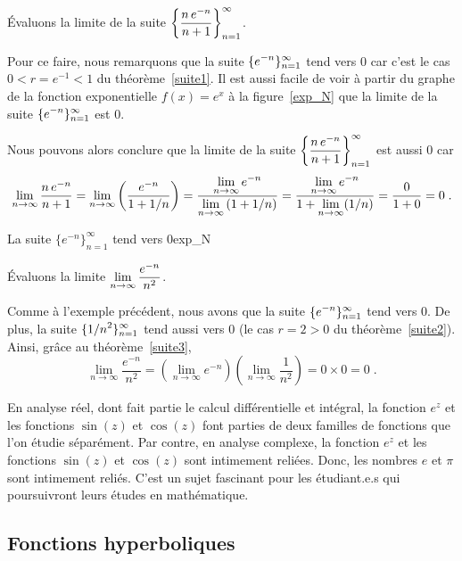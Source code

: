 {\begin{egg}
Évaluons la limite de la suite
$\displaystyle \left\{\frac{n\,e^{-n}}{n+1}\right\}_{n=1}^\infty$.

Pour ce faire, nous remarquons que la suite
$\displaystyle \{ e^{-n} \}_{n=1}^\infty$ tend vers $0$ car c'est le
cas $0< r = e^{-1}<1$ du théorème~\ref{suite1}.  Il est aussi facile
de voir à partir du graphe de la fonction exponentielle $f(x)=e^x$
à la figure~\ref{exp_N} que la limite de la suite
$\displaystyle \{ e^{-n}\}_{n=1}^\infty$ est $0$. 

Nous pouvons alors conclure que la limite de la suite
$\displaystyle \left\{\frac{n\,e^{-n}}{n+1}\right\}_{n=1}^\infty$ est
aussi $0$ car
\[
\lim_{n\rightarrow \infty} \frac{n\, e^{-n}}{n+1}
= \lim_{n\rightarrow \infty} \left( \frac{e^{-n}}{1+1/n} \right)
= \frac{\displaystyle \lim_{n\rightarrow \infty} e^{-n}}
{\displaystyle \lim_{n\rightarrow \infty} \left(1 + 1/n\right)}
= \frac{\displaystyle \lim_{n\rightarrow \infty} e^{-n}}
{\displaystyle 1 + \lim_{n\rightarrow \infty} (1/n)}
= \frac{0}{1+0} = 0 \; .
\]
\end{egg}

{La suite $\{e^{-n}\}_{n=1}^\infty$ tend vers $0$}{exp_N}

\begin{egg}
Évaluons la limite
$\displaystyle \lim_{n\rightarrow \infty} \frac{e^{-n}}{n^2}$.

Comme à l'exemple précédent, nous avons que la suite
$\displaystyle \{ e^{-n} \}_{n=1}^\infty$ tend vers $0$.  De plus, la
suite $\displaystyle \{ 1/n^2 \}_{n=1}^\infty$ tend aussi vers $0$
(le cas $r=2>0$ du théorème~\ref{suite2}).  Ainsi, grâce au
théorème~\ref{suite3},
\[
\lim_{n\rightarrow \infty} \frac{e^{-n}}{n^2}
= \left(\lim_{n\rightarrow \infty} e^{-n} \right)
\left(\lim_{n\rightarrow \infty} \frac{1}{n^2}\right) = 0\times 0 = 0 \; .
\]
\end{egg}

\begin{rmk}[\theory]
En analyse réel, dont fait partie le calcul différentielle et intégral,
la fonction $e^z$ et les fonctions $\sin(z)$ et $\cos(z)$ font parties
de deux familles de fonctions que l'on étudie séparément.  Par contre,
en analyse complexe, la fonction $e^z$ et les fonctions $\sin(z)$ et
$\cos(z)$ sont intimement reliées.  Donc, les nombres $e$ et $\pi$
sont intimement reliés.  C'est un sujet fascinant pour les  
étudiant.e.s qui poursuivront leurs études en mathématique.
\end{rmk}

\subsection{Fonctions hyperboliques \eng}

}
